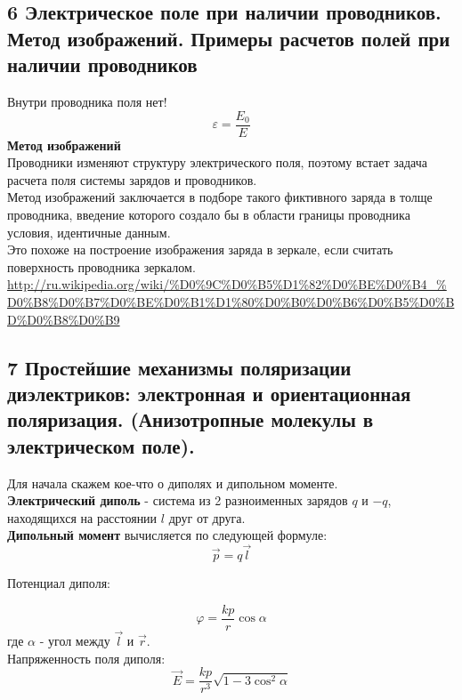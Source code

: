 \documentclass[a4paper,12pt]{article}
\begin{document}
\subsection{6   Электрическое поле при наличии проводников. Метод изображений. Примеры расчетов полей при наличии проводников}
Внутри проводника поля нет!\\
\begin{equation}
	\varepsilon = \frac{E_0}{E}
\end{equation}
\textbf{Метод изображений} \\
Проводники изменяют структуру электрического поля, поэтому встает задача расчета поля системы зарядов и проводников. \\
Метод изображений заключается в подборе такого фиктивного заряда в толще проводника, введение которого создало бы в области границы проводника условия, идентичные данным. \\
Это похоже на построение изображения заряда в зеркале, если считать поверхность проводника зеркалом. \\
\url{http://ru.wikipedia.org/wiki/%D0%9C%D0%B5%D1%82%D0%BE%D0%B4_%D0%B8%D0%B7%D0%BE%D0%B1%D1%80%D0%B0%D0%B6%D0%B5%D0%BD%D0%B8%D0%B9}

\subsection{7   Простейшие механизмы поляризации диэлектриков: электронная и ориентационная поляризация. (Анизотропные молекулы в электрическом поле).}
Для начала скажем кое-что о диполях и дипольном моменте. \\
\textbf{Электрический диполь} - система из 2 разноименных зарядов $ q $ и $ -q $, находящихся на расстоянии $ l $ друг от друга. \\
\textbf{Дипольный момент} вычисляется по следующей формуле:
\begin{equation}
	\vec{p} = q \vec{l}
\end{equation}

Потенциал диполя:

\begin{equation}
	\varphi = \frac {k p} {r} \cos {\alpha}
\end{equation}
где $ \alpha $ - угол между $ \vec{l} $ и $ \vec{r} $. \\

Напряженность поля диполя:
\begin{equation}
	\vec{E} = \frac {k p} {r^3} \sqrt {1 - 3 \cos^2 {\alpha}}
\end{equation}
\end{document}
